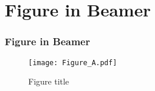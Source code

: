 
\section{Figure in Beamer}

\begin{frame}
	\frametitle{Figure in Beamer}
	\begin{figure}
		\texttt{[image: Figure\_A.pdf]}
		\caption{Figure title}
	\end{figure}
\end{frame}
